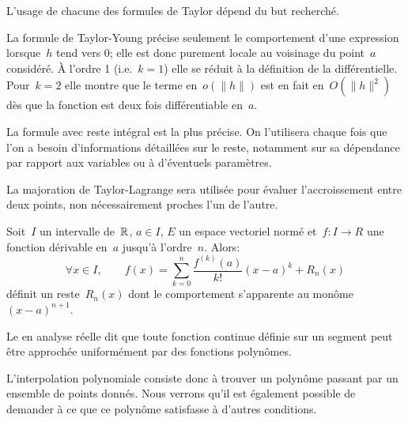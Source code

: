 \begin{remarque}
L'usage de chacune des formules de Taylor dépend du but recherché.

La formule de Taylor-Young précise seulement le comportement d'une expression lorsque~$h$ tend vers 0; elle est donc purement locale au voisinage du point~$a$ considéré. À l'ordre 1 (i.e.~$k=1$) elle se réduit à la définition de la différentielle. Pour~$k=2$ elle montre que le terme en~$o(\|h\|)$ est en fait en~$O(\|h\|^2)$ dès que la fonction est deux fois  différentiable en~$a$.

La formule avec reste intégral est la plus précise. On l'utilisera chaque fois que l'on a besoin d'informations détaillées sur le reste, notamment sur sa dépendance par rapport aux variables ou à d'éventuels paramètres.

La majoration de Taylor-Lagrange sera utilisée pour évaluer l'accroissement entre deux points, non nécessairement proches l'un de l'autre.
\end{remarque}
\begin{theoreme}\label{Th-Taylor}
Soit~$I$ un intervalle de~$\mathbb R$, $a\in I$, $E$ un espace vectoriel normé et~$f: I\rightarrow R$ une fonction dérivable en~$a$ 
jusqu’à l’ordre~$n$. Alors:
\begin{equation}
\forall x\in I, \qquad
f(x) =\sum_{k=0}^n \frac{f^{(k)}(a)}{k!}(x-a)^k + R_n(x)
\end{equation}
définit un reste~$R_n(x)$ dont le comportement s'apparente au monôme~$(x-a)^{n+1}$.
\end{theoreme}
\medskipvm
Le  en analyse réelle dit que toute fonction continue définie sur un segment peut être approchée uniformément par des fonctions polynômes. 

L'interpolation polynomiale consiste donc à trouver un polynôme passant par un ensemble de points donnés. Nous verrons qu'il est également possible de demander à ce que ce polynôme satisfasse à d'autres conditions.
 
